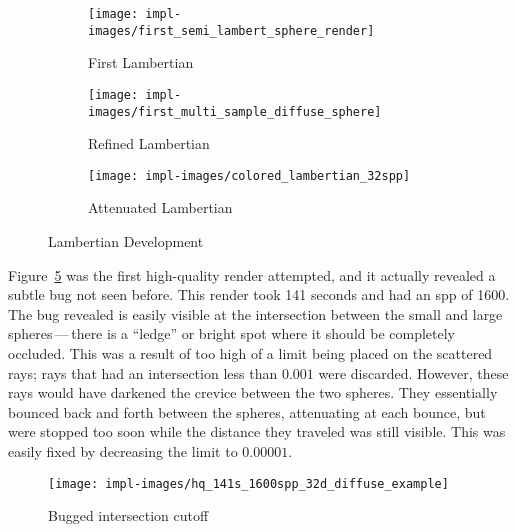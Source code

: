 \vspace{0.3em}
\begin{figure}[htb]
  \centering
  \begin{subfigure}[htb]{0.3\textwidth}
    \texttt{[image: impl-images/first\_semi\_lambert\_sphere\_render]}
    \caption{First Lambertian}
\label{fig:rayterm-cpu_lambert}
  \end{subfigure}
  \begin{subfigure}[htb]{0.3\textwidth}
    \texttt{[image: impl-images/first\_multi\_sample\_diffuse\_sphere]}
    \caption{Refined Lambertian}
\label{fig:rayterm-cpu_lambert_refined}
  \end{subfigure}
  \begin{subfigure}[htb]{0.3\textwidth}
    \texttt{[image: impl-images/colored\_lambertian\_32spp]}
    \caption{Attenuated Lambertian}
\label{fig:rayterm-cpu_lambert_colored}
  \end{subfigure}
  \caption{Lambertian Development}
\label{fig:rayterm-cpu_lambert_development}
\end{figure}

Figure~\ref{fig:rayterm-cpu_intersection_bug} was the first high-quality render attempted, and it actually revealed a subtle bug not seen before.
This render took 141 seconds and had an spp of 1600.
The bug revealed is easily visible at the intersection between the small and large spheres\,---\,there is a ``ledge'' or bright spot where it should be completely occluded.
This was a result of too high of a limit being placed on the scattered rays; rays that had an intersection less than $0.001$ were discarded.
However, these rays would have darkened the crevice between the two spheres.
They essentially bounced back and forth between the spheres, attenuating at each bounce, but were stopped too soon while the distance they traveled was still visible.
This was easily fixed by decreasing the limit to $0.00001$.

\vspace{0.3em}
\begin{figure}[htb]
  \centering
  \texttt{[image: impl-images/hq\_141s\_1600spp\_32d\_diffuse\_example]}
  \caption{Bugged intersection cutoff}
\label{fig:rayterm-cpu_intersection_bug}
\end{figure}

